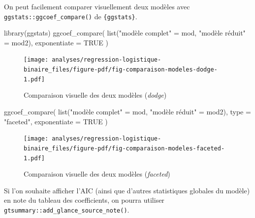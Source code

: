 \documentclass[
  letterpaper,
  DIV=11,
  numbers=noendperiod,
  oneside]{scrreprt}
\newenvironment{Shaded}{\begin{snugshade}}{\end{snugshade}}
\newcommand{\AttributeTok}[1]{\textcolor[rgb]{0.40,0.45,0.13}{#1}}
\newcommand{\ConstantTok}[1]{\textcolor[rgb]{0.56,0.35,0.01}{#1}}
\newcommand{\FunctionTok}[1]{\textcolor[rgb]{0.28,0.35,0.67}{#1}}
\newcommand{\NormalTok}[1]{\textcolor[rgb]{0.00,0.23,0.31}{#1}}
\newcommand{\OtherTok}[1]{\textcolor[rgb]{0.00,0.23,0.31}{#1}}
\newcommand{\StringTok}[1]{\textcolor[rgb]{0.13,0.47,0.30}{#1}}
\begin{document}
On peut facilement comparer visuellement deux modèles avec
\texttt{ggstats::ggcoef\_compare()} de \texttt{\{ggstats\}}.

\begin{Shaded}
\begin{Highlighting}[]
\FunctionTok{library}\NormalTok{(ggstats)}
\FunctionTok{ggcoef\_compare}\NormalTok{(}
  \FunctionTok{list}\NormalTok{(}\StringTok{"modèle complet"} \OtherTok{=}\NormalTok{ mod, }\StringTok{"modèle réduit"} \OtherTok{=}\NormalTok{ mod2), }
  \AttributeTok{exponentiate =} \ConstantTok{TRUE}
\NormalTok{)}
\end{Highlighting}
\end{Shaded}

\begin{figure}[H]

{\centering \texttt{[image: analyses/regression-logistique-binaire\_files/figure-pdf/fig-comparaison-modeles-dodge-1.pdf]}

}

\caption{\label{fig-comparaison-modeles-dodge}Comparaison visuelle des
deux modèles (\emph{dodge})}

\end{figure}

\begin{Shaded}
\begin{Highlighting}[]
\FunctionTok{ggcoef\_compare}\NormalTok{(}
  \FunctionTok{list}\NormalTok{(}\StringTok{"modèle complet"} \OtherTok{=}\NormalTok{ mod, }\StringTok{"modèle réduit"} \OtherTok{=}\NormalTok{ mod2), }
  \AttributeTok{type =} \StringTok{"faceted"}\NormalTok{,}
  \AttributeTok{exponentiate =} \ConstantTok{TRUE}
\NormalTok{)}
\end{Highlighting}
\end{Shaded}

\begin{figure}[H]

{\centering \texttt{[image: analyses/regression-logistique-binaire\_files/figure-pdf/fig-comparaison-modeles-faceted-1.pdf]}

}

\caption{\label{fig-comparaison-modeles-faceted}Comparaison visuelle des
deux modèles (\emph{faceted})}

\end{figure}

Si l'on souhaite afficher l'AIC (ainsi que d'autres statistiques
globales du modèle) en note du tableau des coefficients, on pourra
utiliser \texttt{gtsummary::add\_glance\_source\_note()}.
\end{document}
